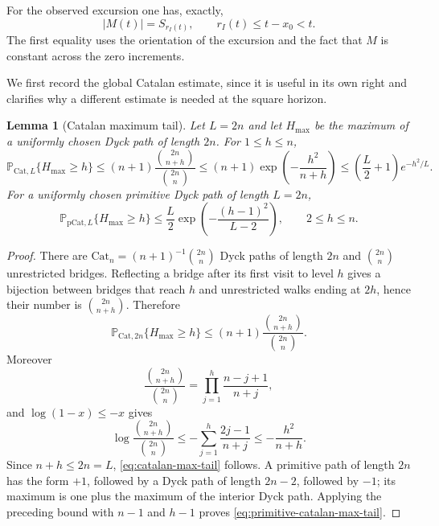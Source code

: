 \documentclass[11pt]{amsart}
\numberwithin{equation}{section}
\theoremstyle{plain}
\newtheorem{lemma}[theorem]{Lemma}
\theoremstyle{definition}
\theoremstyle{remark}
\begin{document}
For the observed excursion one has, exactly,
\begin{equation}
\label{eq:support-time-height}
 |M(t)|=S_{r_I(t)},
 \qquad
 r_I(t)\le t-x_0<t.
\end{equation}
The first equality uses the orientation of the excursion and the fact that
$M$ is constant across the zero increments.

We first record the global Catalan estimate, since it is useful in its own
right and clarifies why a different estimate is needed at the square
horizon.

\begin{lemma}[Catalan maximum tail]
\label{lem:catalan-max-tail}
Let $L=2n$ and let $H_{\max}$ be the maximum of a uniformly chosen Dyck path
of length $2n$.  For $1\le h\le n$,
\begin{equation}
\label{eq:catalan-max-tail}
 \mathbb P_{\mathrm{Cat},L}\{H_{\max}\ge h\}
 \le (n+1)\frac{\binom{2n}{n+h}}{\binom{2n}{n}}
 \le (n+1)\exp\!\left(-\frac{h^2}{n+h}\right)
 \le \left(\frac L2+1\right)e^{-h^2/L}.
\end{equation}
For a uniformly chosen primitive Dyck path of length $L=2n$,
\begin{equation}
\label{eq:primitive-catalan-max-tail}
 \mathbb P_{\mathrm{pCat},L}\{H_{\max}\ge h\}
 \le \frac L2\exp\!\left(-\frac{(h-1)^2}{L-2}\right),
 \qquad 2\le h\le n.
\end{equation}
\end{lemma}

\begin{proof}
There are $\mathrm{Cat}_n=(n+1)^{-1}\binom{2n}{n}$ Dyck paths of length $2n$ and
$\binom{2n}{n}$ unrestricted bridges.  Reflecting a bridge after its first
visit to level $h$ gives a bijection between bridges that reach $h$ and
unrestricted walks ending at $2h$, hence their number is
$\binom{2n}{n+h}$.  Therefore
\[
 \mathbb P_{\mathrm{Cat},2n}\{H_{\max}\ge h\}
 \le (n+1)\frac{\binom{2n}{n+h}}{\binom{2n}{n}}.
\]
Moreover
\[
 \frac{\binom{2n}{n+h}}{\binom{2n}{n}}
 =\prod_{j=1}^h\frac{n-j+1}{n+j},
\]
and $\log(1-x)\le-x$ gives
\[
 \log\frac{\binom{2n}{n+h}}{\binom{2n}{n}}
 \le-\sum_{j=1}^h\frac{2j-1}{n+j}
 \le-\frac{h^2}{n+h}.
\]
Since $n+h\le2n=L$, \eqref{eq:catalan-max-tail} follows.  A primitive path
of length $2n$ has the form $+1$, followed by a Dyck path of length $2n-2$,
followed by $-1$; its maximum is one plus the maximum of the interior Dyck
path.  Applying the preceding bound with $n-1$ and $h-1$ proves
\eqref{eq:primitive-catalan-max-tail}.
\end{proof}
\end{document}
